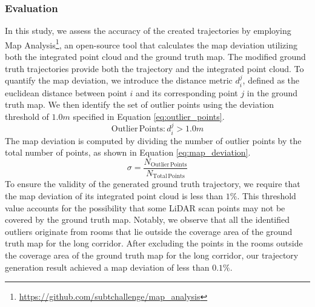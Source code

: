 \documentclass[10pt,twocolumn,letterpaper]{article}
\begin{document}
\subsubsection{Evaluation}
 In this study, we assess the accuracy of the created trajectories by employing Map Analysis\footnote{\href{https://github.com/subtchallenge/map_analysis}{https://github.com/subtchallenge/map\_analysis}}, an open-source tool that calculates the map deviation utilizing both the integrated point cloud and the ground truth map. The modified ground truth trajectories provide both the trajectory and the integrated point cloud. To quantify the map deviation, we introduce the distance metric $d_{i}^{j}$, defined as the euclidean distance between point $i$ and its corresponding point $j$ in the ground truth map. We then identify the set of outlier points using the deviation threshold of $1.0m$ specified in Equation \ref{eq:outlier_points}.
\begin{equation}\label{eq:outlier_points}
\mathrm{Outlier\,Points:} d_{i}^{j} > 1.0m
\end{equation}
The map deviation is computed by dividing the number of outlier points by the total number of points, as shown in Equation \ref{eq:map_deviation}. 
\begin{equation}\label{eq:map_deviation}
\sigma = \frac{N_{\mathrm{Outlier\,Points}}}{N_{\mathrm{Total\,Points}}}
\end{equation}
To ensure the validity of the generated ground truth trajectory, we require that the map deviation of its integrated point cloud is less than $1\%$. This threshold value accounts for the possibility that some LiDAR scan points may not be covered by the ground truth map. Notably, we observe that all the identified outliers originate from rooms that lie outside the coverage area of the ground truth map for the long corridor. After excluding the points in the rooms outside the coverage area of the ground truth map for the long corridor, our trajectory generation result achieved a map deviation of less than $0.1\%$.
\end{document}
